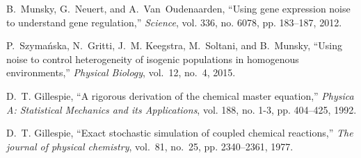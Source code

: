 \documentclass[12pt]{article}
\begin{document}
\begin{thebibliography}{10}
B.~Munsky, G.~Neuert, and A.~Van~Oudenaarden, ``{Using gene expression noise to
  understand gene regulation},'' \emph{Science}, vol. 336, no. 6078, pp.
  183--187, 2012.

P.~Szyma{\'{n}}ska, N.~Gritti, J.~M. Keegstra, M.~Soltani, and B.~Munsky,
  ``{Using noise to control heterogeneity of isogenic populations in homogenous
  environments},'' \emph{Physical Biology}, vol.~12, no.~4, 2015.

D.~T. Gillespie, ``{A rigorous derivation of the chemical master equation},''
  \emph{Physica A: Statistical Mechanics and its Applications}, vol. 188, no.
  1-3, pp. 404--425, 1992.

D.~T. Gillespie, ``{Exact stochastic simulation of coupled chemical reactions},''
  \emph{The journal of physical chemistry}, vol.~81, no.~25, pp. 2340--2361,
  1977.

\end{thebibliography}
\end{document}
